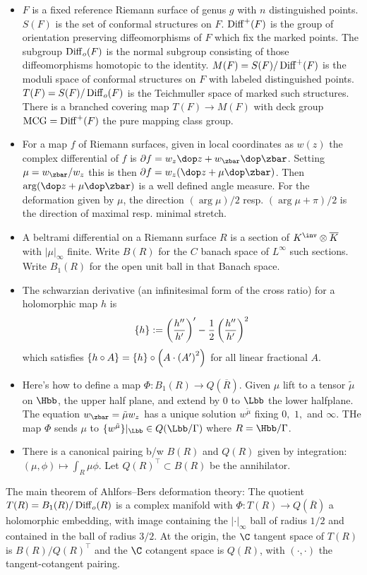 \documentclass[11pt]{amsart}
\begin{document}
\begin{itemize}
  \item $F$ is a fixed reference Riemann surface of genus $g$ with $n$ distinguished points. $S(F)$ is the set of conformal structures on $F$. $\operatorname{Diff}^+(F)$ is the group of orientation preserving diffeomorphisms of $F$ which fix the marked points. The subgroup $\operatorname{Diff}_o(F)$ is the normal subgroup consisting of those diffeomorphisms homotopic to the identity.  $M(F)=S(F)/\operatorname{Diff}^+(F)$ is the moduli space of conformal structures on $F$ with labeled distinguished points. $T(F)=S(F)/\operatorname{Diff}_o(F)$ is the Teichmuller space of marked such structures. There is a branched covering map $T(F) \to M(F)$ with deck group $\operatorname{MCG}=\operatorname{Diff}^+(F)$ the pure mapping class group.
  \item For a map $f$ of Riemann surfaces, given in local coordinates as $w(z)$ the complex differential of $f$ is $\partial f= w_z \dop z + w_{\zbar} \dop \zbar$. Setting $\mu = w_{\zbar} / w_z$ this is then $\partial f = w_z ( \dop z + \mu \dop \zbar )$. Then $\arg(\dop z + \mu \dop \zbar)$ is a well defined angle measure. For the deformation given by $\mu$, the direction $(\arg \mu )/2$ resp. $(\arg\mu + \pi)/2$ is the direction of maximal resp. minimal stretch. 
  \item A beltrami differential on a Riemann surface $R$ is a section of $K^\inv \otimes \overline{K}$ with $ |\mu |_\infty$ finite. Write $B(R)$ for the $C$ banach space of $L^\infty$ such sections. Write $B_1(R)$ for the open unit ball in that Banach space. 
  \item The schwarzian derivative (an infinitesimal form of the cross ratio) for a holomorphic map $h$ is \[ \{ h \}:= \left(\frac{h''}{h'}\right)'-\frac{1}{2}\left(\frac{h''}{h'}\right)^2 \] which satisfies $\{ h \circ A\} = \{ h\} \circ \left( A\cdot \left( A'\right) ^2\right)$ for all linear fractional $A$. 
  \item Here's how to define a map $\Phi:B_1(R) \to Q(\overline{R})$. Given $\mu$ lift to a tensor $\tilde{\mu}$ on $\Hbb$, the upper half plane, and extend by $0$ to $\Lbb$ the lower halfplane. The equation $w_{\zbar} = \tilde{\mu} w_z$ has a unique solution $w^{\tilde{\mu}}$ fixing $0,$ $1,$ and $\infty$. THe map $\Phi$ sends $\mu$ to $\{ w^{\tilde{\mu}} \} \vert_\Lbb \in Q(\Lbb/ \Gamma)$ where $R=\Hbb/\Gamma$.
  \item There is a canonical pairing b/w $B(R)$ and $Q(R)$ given by integration: $(\mu, \phi) \mapsto \int_R \mu \phi$. Let $Q(R)^\top \subset B(R)$ be the annihilator.
\end{itemize}
\begin{thm}
The main theorem of Ahlfors--Bers deformation theory: The quotient $T(R)= B_1(R)/\operatorname{Diff}_o(R)$ is a complex manifold with $\Phi: T(R) \to Q(\overline{R})$ a holomorphic embedding, with image containing the $|\cdot |_\infty $ ball of radius $1/2$ and contained in the ball of radius $3/2$. At the origin, the $\C$ tangent space of $T(R)$ is $B(R)/Q(R)^\top$ and the $\C$ cotangent space is $Q(R)$, with $( \cdot , \cdot )$ the tangent-cotangent pairing.
\end{thm}
\end{document}
